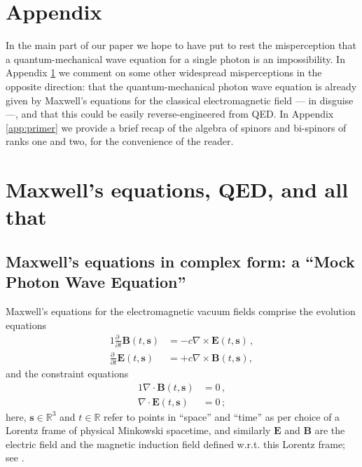 \documentclass[11pt]{article}
\theoremstyle{definition}
\newcommand{\pddt}{\frac{\partial\phantom{t}}{\partial t}}
\newcommand{\vect}[1] {\boldsymbol{{ #1}} }
\newcommand{\sV}{{\vect{s}}}            %
\numberwithin{equation}{section}
\newcommand{\bB}{\mathbf{B}}
\newcommand{\bE}{\mathbf{E}}
\newcommand{\Rset}{{\mathbb R}}
\newcommand{\nab}{\nabla}
\begin{document}
\section*{Appendix}\vspace{-5pt}
\appendix

 In the main part of our paper we hope to have put to rest the misperception that a quantum-mechanical wave equation for
a single photon is an impossibility.
 In Appendix \ref{app:others} we comment on some other widespread misperceptions in the opposite direction:
 that the quantum-mechanical photon wave equation is already given by Maxwell's equations for the classical electromagnetic field
--- in disguise ---, and that this could be easily reverse-engineered from QED. 
 In Appendix \ref{app:primer} we provide a brief recap of the algebra of spinors and bi-spinors of ranks one and two, 
 for the convenience of the reader. \vspace{-10pt}

\section{Maxwell's equations, QED, and all that}\label{app:others}

\subsection{Maxwell's equations in complex form: a ``Mock Photon Wave Equation''}\vspace{-5pt}

 Maxwell's equations for the electromagnetic vacuum fields comprise the evolution equations
\begin{alignat}{1}
\textstyle
\pddt{\bB(t,\sV)}
&= \label{eq:MLdotB}
        -c\nab\times\bE(t,\sV) \, ,
\\
\textstyle
         \pddt{\bE(t,\sV)}
&= \label{eq:MLdotE}
        +c\nab\times\bB(t,\sV)  ,
\end{alignat}
and the constraint equations
\begin{alignat}{1}
\textstyle
        \nab\cdot \bB(t,\sV)  
&= \label{eq:MLdivB}
        0\, ,
\\
        \nab\cdot\bE(t,\sV)  
&=\label{eq:MLdivE}
       0\,;
\end{alignat}
here, 
$\sV\in\Rset^3$ and $t\in\Rset$ refer to points in ``space'' and ``time'' as per choice of a Lorentz frame of physical Minkowski 
spacetime, and similarly $\bE$ and $\bB$ are the electric field and the magnetic induction field defined w.r.t. this 
Lorentz frame; see \cite{JacksonBOOK}.
\end{document}
